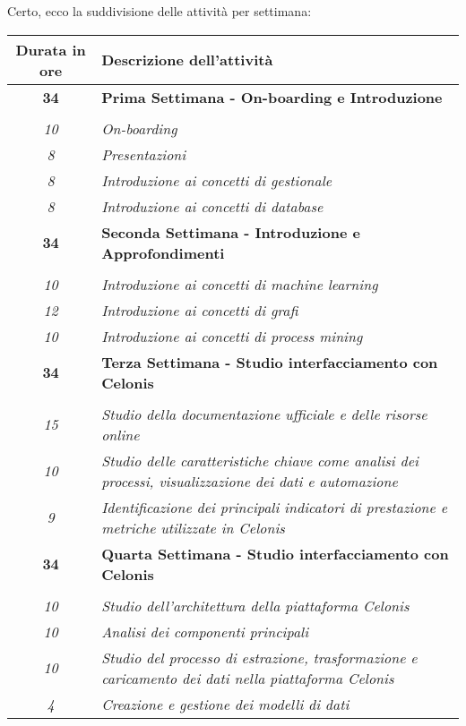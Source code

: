 Certo, ecco la suddivisione delle attività per settimana:


\begin{tabularx}{\textwidth}{|c|X|}
	\hline
	\textbf{Durata in ore} & \textbf{Descrizione dell'attività} \\\hline

	\textbf{34} & \textbf{Prima Settimana - On-boarding e Introduzione} \\
\hdashline
\multirow{5}{0cm}\\
\textit{10} &
\textit{On-boarding} \\
\textit{8} &
\textit{Presentazioni} \\
\textit{8} &
\textit{Introduzione ai concetti di gestionale} \\
\textit{8} &
\textit{Introduzione ai concetti di database} \\
\hline

\textbf{34} & \textbf{Seconda Settimana - Introduzione e Approfondimenti} \\
\hdashline
\multirow{4}{0cm}\\
\textit{10} &
\textit{Introduzione ai concetti di machine learning} \\
\textit{12} &
\textit{Introduzione ai concetti di grafi} \\
\textit{10} &
\textit{Introduzione ai concetti di process mining} \\
\hline

\textbf{34} & \textbf{Terza Settimana - Studio interfacciamento con Celonis} \\
\hdashline
\multirow{5}{0cm}\\
\textit{15} &
\textit{Studio della documentazione ufficiale e delle risorse online} \\
\textit{10} &
\textit{Studio delle caratteristiche chiave come analisi dei processi, visualizzazione dei dati e automazione} \\
\textit{9} &
\textit{Identificazione dei principali indicatori di prestazione e metriche utilizzate in Celonis} \\
\hline

\textbf{34} & \textbf{Quarta Settimana - Studio interfacciamento con Celonis} \\
\hdashline
\multirow{4}{0cm}\\
\textit{10} &
\textit{Studio dell'architettura della piattaforma Celonis} \\
\textit{10} &
\textit{Analisi dei componenti principali} \\
\textit{10} &
\textit{Studio del processo di estrazione, trasformazione e caricamento dei dati nella piattaforma Celonis} \\
\textit{4} &
\textit{Creazione e gestione dei modelli di dati} \\
\hline


\end{tabularx}

